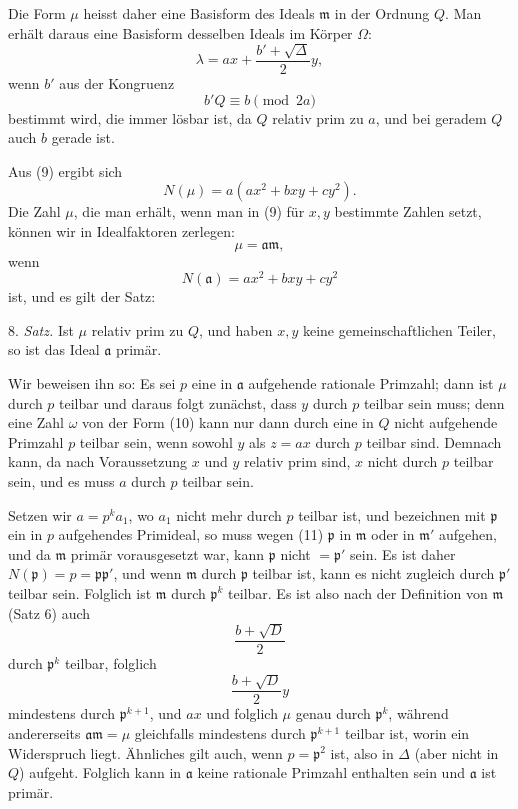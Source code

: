 \documentclass[11pt]{article}
\begin{document}
Die Form $\mu$ heisst daher eine Basisform des Ideals $\mathfrak m$ in der Ordnung $Q$. Man erhält daraus eine Basisform desselben Ideals im Körper $\Omega$:
\[
 \lambda=ax+\frac{b'+\sqrt\Delta}{2}y,
\]
wenn $b'$ aus der Kongruenz
\[
 b'Q\equiv b\pmod{2a}
\]
bestimmt wird, die immer lösbar ist, da $Q$ relativ prim zu $a$, und bei geradem $Q$ auch $b$ gerade ist.

Aus (9) ergibt sich
\begin{equation}
 N(\mu)=a(ax^2+bxy+cy^2).
\tag{12}
\end{equation}
Die Zahl $\mu$, die man erhält, wenn man in (9) für $x,y$ bestimmte Zahlen setzt, können wir in Idealfaktoren zerlegen:
\[
 \mu=\mathfrak a\mathfrak m,
\]
wenn
\begin{equation}
 N(\mathfrak a)=ax^2+bxy+cy^2
\tag{13}
\end{equation}
ist, und es gilt der Satz:

8. \emph{Satz.} Ist $\mu$ relativ prim zu $Q$, und haben $x,y$ keine gemeinschaftlichen Teiler, so ist das Ideal $\mathfrak a$ primär.

Wir beweisen ihn so: Es sei $p$ eine in $\mathfrak a$ aufgehende rationale Primzahl; dann ist $\mu$ durch $p$ teilbar und daraus folgt zunächst, dass $y$ durch $p$ teilbar sein muss; denn eine Zahl $\omega$ von der Form (10) kann nur dann durch eine in $Q$ nicht aufgehende Primzahl $p$ teilbar sein, wenn sowohl $y$ als $z=ax$ durch $p$ teilbar sind. Demnach kann, da nach Voraussetzung $x$ und $y$ relativ prim sind, $x$ nicht durch $p$ teilbar sein, und es muss $a$ durch $p$ teilbar sein.

Setzen wir $a=p^ka_1$, wo $a_1$ nicht mehr durch $p$ teilbar ist, und bezeichnen mit $\mathfrak p$ ein in $p$ aufgehendes Primideal, so muss wegen (11) $\mathfrak p$ in $\mathfrak m$ oder in $\mathfrak m'$ aufgehen, und da $\mathfrak m$ primär vorausgesetzt war, kann $\mathfrak p$ nicht $=\mathfrak p'$ sein. Es ist daher $N(\mathfrak p)=p=\mathfrak p\mathfrak p'$, und wenn $\mathfrak m$ durch $\mathfrak p$ teilbar ist, kann es nicht zugleich durch $\mathfrak p'$ teilbar sein. Folglich ist $\mathfrak m$ durch $\mathfrak p^k$ teilbar. Es ist also nach der Definition von $\mathfrak m$ (Satz 6) auch
\[
 \frac{b+\sqrt D}{2}
\]
durch $\mathfrak p^k$ teilbar, folglich
\[
 \frac{b+\sqrt D}{2}y
\]
mindestens durch $\mathfrak p^{k+1}$, und $ax$ und folglich $\mu$ genau durch $\mathfrak p^k$, während andererseits $\mathfrak a\mathfrak m=\mu$ gleichfalls mindestens durch $\mathfrak p^{k+1}$ teilbar ist, worin ein Widerspruch liegt. Ähnliches gilt auch, wenn $p=\mathfrak p^2$ ist, also in $\Delta$ (aber nicht in $Q$) aufgeht. Folglich kann in $\mathfrak a$ keine rationale Primzahl enthalten sein und $\mathfrak a$ ist primär.
\end{document}

